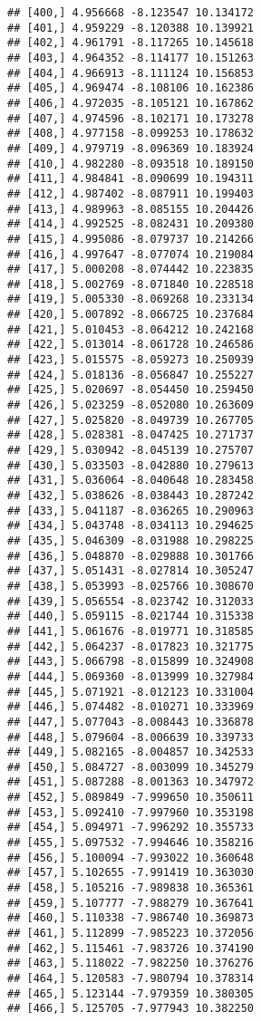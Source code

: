 \documentclass[]{book}
\theoremstyle{definition}
\theoremstyle{definition}
\theoremstyle{definition}
\theoremstyle{remark}
\begin{document}
\begin{verbatim}
## [400,] 4.956668 -8.123547 10.134172
## [401,] 4.959229 -8.120388 10.139921
## [402,] 4.961791 -8.117265 10.145618
## [403,] 4.964352 -8.114177 10.151263
## [404,] 4.966913 -8.111124 10.156853
## [405,] 4.969474 -8.108106 10.162386
## [406,] 4.972035 -8.105121 10.167862
## [407,] 4.974596 -8.102171 10.173278
## [408,] 4.977158 -8.099253 10.178632
## [409,] 4.979719 -8.096369 10.183924
## [410,] 4.982280 -8.093518 10.189150
## [411,] 4.984841 -8.090699 10.194311
## [412,] 4.987402 -8.087911 10.199403
## [413,] 4.989963 -8.085155 10.204426
## [414,] 4.992525 -8.082431 10.209380
## [415,] 4.995086 -8.079737 10.214266
## [416,] 4.997647 -8.077074 10.219084
## [417,] 5.000208 -8.074442 10.223835
## [418,] 5.002769 -8.071840 10.228518
## [419,] 5.005330 -8.069268 10.233134
## [420,] 5.007892 -8.066725 10.237684
## [421,] 5.010453 -8.064212 10.242168
## [422,] 5.013014 -8.061728 10.246586
## [423,] 5.015575 -8.059273 10.250939
## [424,] 5.018136 -8.056847 10.255227
## [425,] 5.020697 -8.054450 10.259450
## [426,] 5.023259 -8.052080 10.263609
## [427,] 5.025820 -8.049739 10.267705
## [428,] 5.028381 -8.047425 10.271737
## [429,] 5.030942 -8.045139 10.275707
## [430,] 5.033503 -8.042880 10.279613
## [431,] 5.036064 -8.040648 10.283458
## [432,] 5.038626 -8.038443 10.287242
## [433,] 5.041187 -8.036265 10.290963
## [434,] 5.043748 -8.034113 10.294625
## [435,] 5.046309 -8.031988 10.298225
## [436,] 5.048870 -8.029888 10.301766
## [437,] 5.051431 -8.027814 10.305247
## [438,] 5.053993 -8.025766 10.308670
## [439,] 5.056554 -8.023742 10.312033
## [440,] 5.059115 -8.021744 10.315338
## [441,] 5.061676 -8.019771 10.318585
## [442,] 5.064237 -8.017823 10.321775
## [443,] 5.066798 -8.015899 10.324908
## [444,] 5.069360 -8.013999 10.327984
## [445,] 5.071921 -8.012123 10.331004
## [446,] 5.074482 -8.010271 10.333969
## [447,] 5.077043 -8.008443 10.336878
## [448,] 5.079604 -8.006639 10.339733
## [449,] 5.082165 -8.004857 10.342533
## [450,] 5.084727 -8.003099 10.345279
## [451,] 5.087288 -8.001363 10.347972
## [452,] 5.089849 -7.999650 10.350611
## [453,] 5.092410 -7.997960 10.353198
## [454,] 5.094971 -7.996292 10.355733
## [455,] 5.097532 -7.994646 10.358216
## [456,] 5.100094 -7.993022 10.360648
## [457,] 5.102655 -7.991419 10.363030
## [458,] 5.105216 -7.989838 10.365361
## [459,] 5.107777 -7.988279 10.367641
## [460,] 5.110338 -7.986740 10.369873
## [461,] 5.112899 -7.985223 10.372056
## [462,] 5.115461 -7.983726 10.374190
## [463,] 5.118022 -7.982250 10.376276
## [464,] 5.120583 -7.980794 10.378314
## [465,] 5.123144 -7.979359 10.380305
## [466,] 5.125705 -7.977943 10.382250

\end{verbatim}
\end{document}
